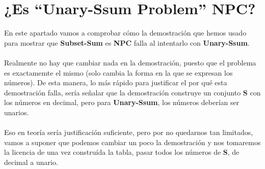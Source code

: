 \documentclass[../main]{subfiles}
\begin{document}
\chapter{¿Es ``Unary-Ssum Problem” NPC?}

{
\hypersetup{linkcolor=black}
\minitoc
\vspace{5mm}
}

En este apartado vamos a comprobar cómo la demostración que hemos usado para mostrar que \textbf{Subset-Sum }es \textbf{NPC} falla al intentarlo con \textbf{Unary-Ssum}. \\\\
Realmente no hay que cambiar nada en la demostración, puesto que el problema es exactamemte el mismo (solo cambia la forma en la que se expresan los números). De esta manera, lo más rápido para justificar el por qué esta demostración falla, sería señalar que la demostración construye un conjunto \textbf{S} con los números en decimal, pero para \textbf{Unary-Ssum}, los números deberían ser unarios. \\\\
Eso en teoría sería justificación suficiente, pero por no quedarnos tan limitados, vamos a suponer que podemos cambiar un poco la demostración y nos tomaremos la licencia de una vez construída la tabla, pasar todos los números de \textbf{S}, de decimal a unario.
\end{document}
